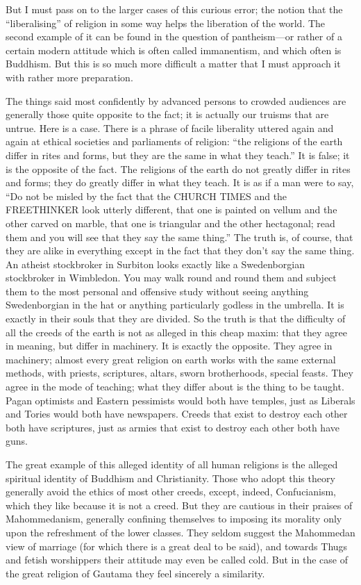 But I must pass on to the larger cases of this curious error; the notion that the “liberalising” of religion in some way helps the liberation of the world. The second example of it can be found in the question of pantheism—or rather of a certain modern attitude which is often called immanentism, and which often is Buddhism. But this is so much more difficult a matter that I must approach it with rather more preparation.

The things said most confidently by advanced persons to crowded audiences are generally those quite opposite to the fact; it is actually our truisms that are untrue. Here is a case. There is a phrase of facile liberality uttered again and again at ethical societies and parliaments of religion: “the religions of the earth differ in rites and forms, but they are the same in what they teach.” It is false; it is the opposite of the fact. The religions of the earth do not greatly differ in rites and forms; they do greatly differ in what they teach. It is as if a man were to say, “Do not be misled by the fact that the CHURCH TIMES and the FREETHINKER look utterly different, that one is painted on vellum and the other carved on marble, that one is triangular and the other hectagonal; read them and you will see that they say the same thing.” The truth is, of course, that they are alike in everything except in the fact that they don’t say the same thing. An atheist stockbroker in Surbiton looks exactly like a Swedenborgian stockbroker in Wimbledon. You may walk round and round them and subject them to the most personal and offensive study without seeing anything Swedenborgian in the hat or anything particularly godless in the umbrella. It is exactly in their souls that they are divided. So the truth is that the difficulty of all the creeds of the earth is not as alleged in this cheap maxim: that they agree in meaning, but differ in machinery. It is exactly the opposite. They agree in machinery; almost every great religion on earth works with the same external methods, with priests, scriptures, altars, sworn brotherhoods, special feasts. They agree in the mode of teaching; what they differ about is the thing to be taught. Pagan optimists and Eastern pessimists would both have temples, just as Liberals and Tories would both have newspapers. Creeds that exist to destroy each other both have scriptures, just as armies that exist to destroy each other both have guns.

The great example of this alleged identity of all human religions is the alleged spiritual identity of Buddhism and Christianity. Those who adopt this theory generally avoid the ethics of most other creeds, except, indeed, Confucianism, which they like because it is not a creed. But they are cautious in their praises of Mahommedanism, generally confining themselves to imposing its morality only upon the refreshment of the lower classes. They seldom suggest the Mahommedan view of marriage (for which there is a great deal to be said), and towards Thugs and fetish worshippers their attitude may even be called cold. But in the case of the great religion of Gautama they feel sincerely a similarity.

